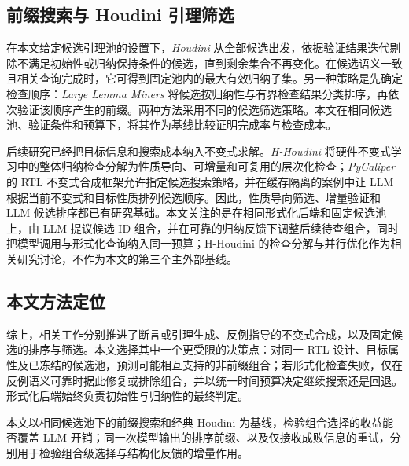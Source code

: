 \subsection{前缀搜索与 Houdini 引理筛选}

在本文给定候选引理池的设置下，\emph{Houdini} 从全部候选出发，依据验证结果迭代剔除不满足初始性或归纳保持条件的候选，直到剩余集合不再变化\cite{flanagan2001houdini}。在候选语义一致且相关查询完成时，它可得到固定池内的最大有效归纳子集。另一种策略是先确定检查顺序：\emph{Large Lemma Miners} 将候选按归纳性与有界检查结果分类排序，再依次验证该顺序产生的前缀\cite{peled2026large}。两种方法采用不同的候选筛选策略。本文在相同候选池、验证条件和预算下，将其作为基线比较证明完成率与检查成本。

后续研究已经把目标信息和搜索成本纳入不变式求解。\emph{H-Houdini} 将硬件不变式学习中的整体归纳检查分解为性质导向、可增量和可复用的层次化检查\cite{dinesh2025hhoudini}；\emph{PyCaliper} 的 RTL 不变式合成框架允许指定候选搜索策略，并在缓存隔离的案例中让 LLM 根据当前不变式和目标性质排列候选顺序\cite{godbole2025pycaliper}。因此，性质导向筛选、增量验证和 LLM 候选排序都已有研究基础。本文关注的是在相同形式化后端和固定候选池上，由 LLM 提议候选 ID 组合，并在可靠的归纳反馈下调整后续待查组合，同时把模型调用与形式化查询纳入同一预算；H-Houdini 的检查分解与并行优化作为相关研究讨论，不作为本文的第三个主外部基线。

\subsection{本文方法定位}

综上，相关工作分别推进了断言或引理生成、反例指导的不变式合成，以及固定候选的排序与筛选。本文选择其中一个更受限的决策点：对同一 RTL 设计、目标属性及已冻结的候选池，预测可能相互支持的非前缀组合；若形式化检查失败，仅在反例语义可靠时据此修复或排除组合，并以统一时间预算决定继续搜索还是回退。形式化后端始终负责初始性与归纳性的最终判定。

本文以相同候选池下的前缀搜索和经典 Houdini 为基线，检验组合选择的收益能否覆盖 LLM 开销；同一次模型输出的排序前缀、以及仅接收成败信息的重试，分别用于检验组合级选择与结构化反馈的增量作用。
